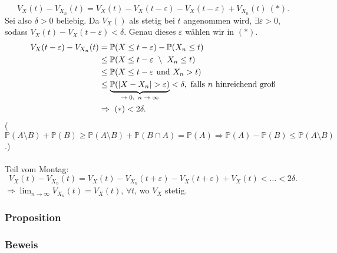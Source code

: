 \[
V_X(t)-V_{X_n}(t)=V_X(t)-V_X(t-\varepsilon)-V_X(t-\varepsilon)+V_{X_n}(t)\ (*).
\] Sei also $\delta>0$ beliebig.
Da $V_X()$ als stetig bei $t$ angenommen wird, $\exists\varepsilon>0$, sodass $V_X(t)-V_X(t-\varepsilon)<\delta$.
Genau dieses $\varepsilon$ w\"ahlen wir in $(*)$.
\begin{align*}
V_X(t-\varepsilon)-V_{X_n}(t)&=\mathbb{P}(X\leq t-\varepsilon)-\mathbb{P}(X_n\leq t)\\
&\leq\mathbb{P}(X\leq t-\varepsilon\ \setminus\ X_n\leq t)\\
&\leq\mathbb{P}(X\leq t-\varepsilon\text{ und }X_n>t)\\
&\leq\ubr{\mathbb{P}(|X-X_n|>\varepsilon)}{$\to0,\ n\to\infty$}<\delta,\text{ falls $n$ hinreichend gro\ss{}}\\
&\Rightarrow\ (*)<2\delta.
\end{align*}
($\mathbb{P}(A\setminus B)+\mathbb{P}(B)\geq\mathbb{P}(A\setminus B)+\mathbb{P}(B\cap A)=\mathbb{P}(A)\Rightarrow\mathbb{P}(A)-\mathbb{P}(B)\leq\mathbb{P}(A\setminus B)$.)
\\~\\
Teil vom Montag:
\[
V_X(t)-V_{X_n}(t)=V_X(t)-V_{X_n}(t+\varepsilon)-V_X(t+\varepsilon)+V_X(t)<\ldots<2\delta.
\]
$\Rightarrow\lim_{n\to\infty}V_{X_n}(t)=V_X(t)$, $\forall t$, wo $V_X$ stetig.
\subsubsection{Proposition}
\subsubsection{Beweis}
